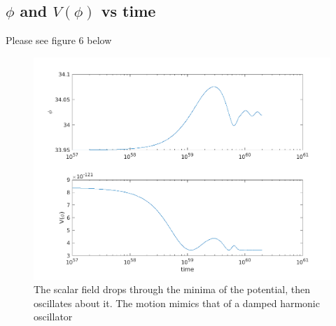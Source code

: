 \documentclass[12pt]{article}
\begin{document}
\subsection{$\phi$ and $V(\phi)$ vs time}
Please see figure 6 below
\begin{figure}
\centering
\includegraphics[width=6in]{phiVt.png}
\caption{The scalar field drops through the minima of the potential, then oscillates about it. The motion mimics that of a damped harmonic oscillator}
\end{figure}
\end{document}
